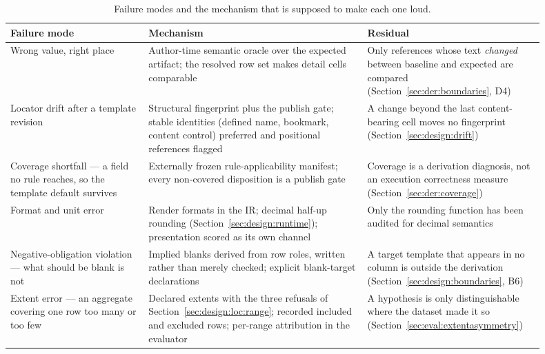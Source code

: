 \begin{table}[htbp]
\centering
\caption{Failure modes and the mechanism that is supposed to make each one loud.}
\label{tab:design:blocks}
\begin{tabular}{p{0.24\linewidth}p{0.38\linewidth}p{0.28\linewidth}}
\hline
\textbf{Failure mode} & \textbf{Mechanism} & \textbf{Residual} \\
\hline
Wrong value, right place & Author-time semantic oracle over the expected artifact; the
resolved row set makes detail cells comparable & Only references whose text \emph{changed}
between baseline and expected are compared (Section~\ref{sec:der:boundaries}, D4) \\
Locator drift after a template revision & Structural fingerprint plus the publish gate;
stable identities (defined name, bookmark, content control) preferred and positional
references flagged & A change beyond the last content-bearing cell moves no fingerprint
(Section~\ref{sec:design:drift}) \\
Coverage shortfall --- a field no rule reaches, so the template default survives & Externally
frozen rule-applicability manifest; every non-covered disposition is a publish gate & Coverage
is a derivation diagnosis, not an execution correctness measure
(Section~\ref{sec:der:coverage}) \\
Format and unit error & Render formats in the IR; decimal half-up rounding
(Section~\ref{sec:design:runtime}); presentation scored as its own channel & Only the rounding
function has been audited for decimal semantics \\
Negative-obligation violation --- what should be blank is not & Implied blanks derived from row
roles, written rather than merely checked; explicit blank-target declarations & A target
template that appears in no column is outside the derivation
(Section~\ref{sec:design:boundaries}, B6) \\
Extent error --- an aggregate covering one row too many or too few & Declared extents with the
three refusals of Section~\ref{sec:design:loc:range}; recorded included and excluded rows;
per-range attribution in the evaluator & A hypothesis is only distinguishable where the
dataset made it so (Section~\ref{sec:eval:extentasymmetry}) \\
\hline
\end{tabular}
\end{table}

